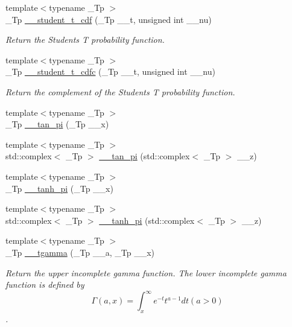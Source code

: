 \begin{DoxyCompactItemize}
{\footnotesize template$<$typename \+\_\+\+Tp $>$ }\\\+\_\+\+Tp \hyperlink{namespacestd_1_1____detail_aadc19f2a38494343a752a8d4f924e3df}{\+\_\+\+\_\+student\+\_\+t\+\_\+cdf} (\+\_\+\+Tp \+\_\+\+\_\+t, unsigned int \+\_\+\+\_\+nu)
\begin{DoxyCompactList}\small\item\em Return the Students T probability function. \end{DoxyCompactList}\item 
{\footnotesize template$<$typename \+\_\+\+Tp $>$ }\\\+\_\+\+Tp \hyperlink{namespacestd_1_1____detail_a3009eaaa4b7d6d845878765ef0e3fa27}{\+\_\+\+\_\+student\+\_\+t\+\_\+cdfc} (\+\_\+\+Tp \+\_\+\+\_\+t, unsigned int \+\_\+\+\_\+nu)
\begin{DoxyCompactList}\small\item\em Return the complement of the Students T probability function. \end{DoxyCompactList}\item 
{\footnotesize template$<$typename \+\_\+\+Tp $>$ }\\\+\_\+\+Tp \hyperlink{namespacestd_1_1____detail_a72fd3b7fcf9f49ade9411d782e8dbe4e}{\+\_\+\+\_\+tan\+\_\+pi} (\+\_\+\+Tp \+\_\+\+\_\+x)
\item 
{\footnotesize template$<$typename \+\_\+\+Tp $>$ }\\std\+::complex$<$ \+\_\+\+Tp $>$ \hyperlink{namespacestd_1_1____detail_ae19d579db4245c9c4e53a70a0513bb00}{\+\_\+\+\_\+tan\+\_\+pi} (std\+::complex$<$ \+\_\+\+Tp $>$ \+\_\+\+\_\+z)
\item 
{\footnotesize template$<$typename \+\_\+\+Tp $>$ }\\\+\_\+\+Tp \hyperlink{namespacestd_1_1____detail_ab0c02d3c15b8297df52b74807f22169b}{\+\_\+\+\_\+tanh\+\_\+pi} (\+\_\+\+Tp \+\_\+\+\_\+x)
\item 
{\footnotesize template$<$typename \+\_\+\+Tp $>$ }\\std\+::complex$<$ \+\_\+\+Tp $>$ \hyperlink{namespacestd_1_1____detail_a75775747d40813d5d54c0b7a7d0c39f0}{\+\_\+\+\_\+tanh\+\_\+pi} (std\+::complex$<$ \+\_\+\+Tp $>$ \+\_\+\+\_\+z)
\item 
{\footnotesize template$<$typename \+\_\+\+Tp $>$ }\\\+\_\+\+Tp \hyperlink{namespacestd_1_1____detail_ad2f6546e22348b07d992d522153d7d6b}{\+\_\+\+\_\+tgamma} (\+\_\+\+Tp \+\_\+\+\_\+a, \+\_\+\+Tp \+\_\+\+\_\+x)
\begin{DoxyCompactList}\small\item\em Return the upper incomplete gamma function. The lower incomplete gamma function is defined by \[ \Gamma(a,x) = \int_x^\infty e^{-t}t^{a-1}dt (a > 0) \]. \end{DoxyCompactList}\item 

\end{DoxyCompactItemize}
